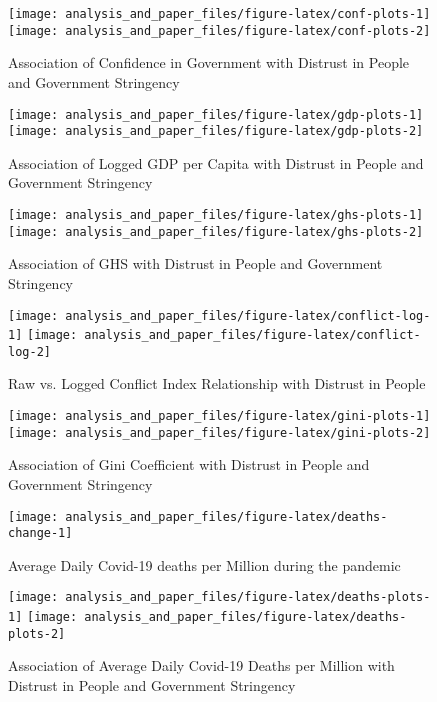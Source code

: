 \documentclass[
  12pt,
]{article}
\begin{document}
\begin{figure}
\texttt{[image: analysis\_and\_paper\_files/figure-latex/conf-plots-1]} \texttt{[image: analysis\_and\_paper\_files/figure-latex/conf-plots-2]} \caption{Association of Confidence in Government with Distrust in People and Government Stringency}\label{fig:conf-plots}
\end{figure}

\begin{figure}
\texttt{[image: analysis\_and\_paper\_files/figure-latex/gdp-plots-1]} \texttt{[image: analysis\_and\_paper\_files/figure-latex/gdp-plots-2]} \caption{Association of Logged GDP per Capita with Distrust in People and Government Stringency}\label{fig:gdp-plots}
\end{figure}

\begin{figure}
\texttt{[image: analysis\_and\_paper\_files/figure-latex/ghs-plots-1]} \texttt{[image: analysis\_and\_paper\_files/figure-latex/ghs-plots-2]} \caption{Association of GHS with Distrust in People and Government Stringency}\label{fig:ghs-plots}
\end{figure}

\begin{figure}
\texttt{[image: analysis\_and\_paper\_files/figure-latex/conflict-log-1]} \texttt{[image: analysis\_and\_paper\_files/figure-latex/conflict-log-2]} \caption{Raw vs. Logged Conflict Index Relationship with Distrust in People}\label{fig:conflict-log}
\end{figure}

\begin{figure}
\texttt{[image: analysis\_and\_paper\_files/figure-latex/gini-plots-1]} \texttt{[image: analysis\_and\_paper\_files/figure-latex/gini-plots-2]} \caption{Association of Gini Coefficient with Distrust in People and Government Stringency}\label{fig:gini-plots}
\end{figure}

\begin{figure}
\texttt{[image: analysis\_and\_paper\_files/figure-latex/deaths-change-1]} \caption{Average Daily Covid-19 deaths per Million during the pandemic}\label{fig:deaths-change}
\end{figure}

\begin{figure}
\texttt{[image: analysis\_and\_paper\_files/figure-latex/deaths-plots-1]} \texttt{[image: analysis\_and\_paper\_files/figure-latex/deaths-plots-2]} \caption{Association of Average Daily Covid-19 Deaths per Million with Distrust in People and Government Stringency}\label{fig:deaths-plots}
\end{figure}
\end{document}
